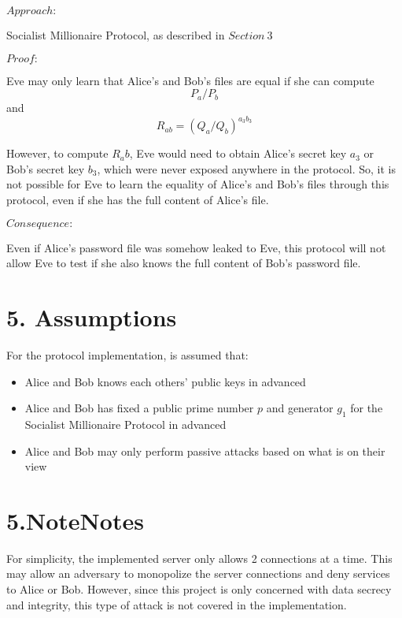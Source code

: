\documentclass{article}
\begin{document}
$Approach:$ 

Socialist Millionaire Protocol, as described in $Section\ 3$

$Proof:$

Eve may only learn that Alice's and Bob's files are equal if she can compute 
$$P_a / P_b$$ and $$R_{ab} = (Q_a/Q_b)^{a_3b_3}$$

However, to compute $R_ab$, Eve would need to obtain Alice's secret key $a_3$
or Bob's secret key $b_3$, which were never exposed anywhere in the protocol.
So, it is not possible for Eve to learn the equality of Alice's and Bob's files 
through this protocol, even if she has the full content of Alice's file.

$Consequence:$ 

Even if Alice's password file was somehow leaked to Eve, this protocol will not allow 
Eve to test if she also knows the full content of Bob's password file.

\section*{5. Assumptions}

For the protocol implementation, is assumed that:

\begin{itemize}
  \item Alice and Bob knows each others' public keys in advanced
  \item Alice and Bob has fixed a public prime number $p$ and generator $g_1$ 
  for the Socialist Millionaire Protocol in advanced
  \item Alice and Bob may only perform passive attacks based on what is on their view
\end{itemize}

\section*{5.NoteNotes}

For simplicity, the implemented server only allows 2 connections at a time. 
This may allow an adversary to monopolize the server connections and deny 
services to Alice or Bob. However, 
since this project is only concerned with data secrecy and 
integrity, this type of attack is not covered in the implementation.
\end{document}
